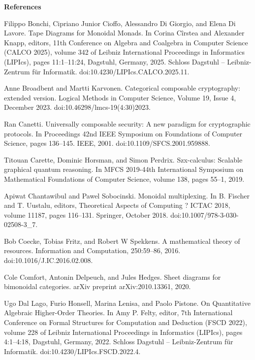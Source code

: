 
 
\par\medskip\noindent\textbf{References}\par
  
\par\noindent  [1]  Filippo Bonchi, Cipriano Junior Cioffo, Alessandro Di Giorgio, and Elena Di Lavore.  Tape Diagrams for Monoidal Monads.  In Corina Cîrstea and Alexander Knapp, editors, 11th Conference on Algebra and Coalgebra in Computer Science (CALCO 2025), volume 342 of Leibniz International Proceedings in Informatics (LIPIcs), pages 11:1–11:24, Dagstuhl, Germany, 2025. Schloss Dagstuhl – Leibniz-Zentrum für Informatik.  doi:10.4230/LIPIcs.CALCO.2025.11.  
 
\par\noindent  [2]  Anne Broadbent and Martti Karvonen.  Categorical composable cryptography: extended version.  Logical Methods in Computer Science, Volume 19, Issue 4, December 2023.  doi:10.46298/lmcs-19(4:30)2023.  
 
\par\noindent  [3]  Ran Canetti.  Universally composable security: A new paradigm for cryptographic protocols.  In Proceedings 42nd IEEE Symposium on Foundations of Computer Science, pages 136–145. IEEE, 2001.  doi:10.1109/SFCS.2001.959888.  
 
\par\noindent  [4]  Titouan Carette, Dominic Horsman, and Simon Perdrix.  Szx-calculus: Scalable graphical quantum reasoning.  In MFCS 2019-44th International Symposium on Mathematical Foundations of Computer Science, volume 138, pages 55–1, 2019.  
 
\par\noindent  [5]  Apiwat Chantawibul and Pawel Sobocinski.  Monoidal multiplexing.  In B. Fischer and T. Uustalu, editors, Theoretical Aspects of Computing ? ICTAC 2018, volume 11187, pages 116–131. Springer, October 2018.  doi:10.1007/978-3-030-02508-3\_7.  
 
\par\noindent  [6]  Bob Coecke, Tobias Fritz, and Robert W Spekkens.  A mathematical theory of resources.  Information and Computation, 250:59–86, 2016.  doi:10.1016/J.IC.2016.02.008.  
 
\par\noindent  [7]  Cole Comfort, Antonin Delpeuch, and Jules Hedges.  Sheet diagrams for bimonoidal categories.  arXiv preprint arXiv:2010.13361, 2020.  
 
\par\noindent  [8]  Ugo Dal Lago, Furio Honsell, Marina Lenisa, and Paolo Pistone.  On Quantitative Algebraic Higher-Order Theories.  In Amy P. Felty, editor, 7th International Conference on Formal Structures for Computation and Deduction (FSCD 2022), volume 228 of Leibniz International Proceedings in Informatics (LIPIcs), pages 4:1–4:18, Dagstuhl, Germany, 2022. Schloss Dagstuhl – Leibniz-Zentrum für Informatik.  doi:10.4230/LIPIcs.FSCD.2022.4.  
 
